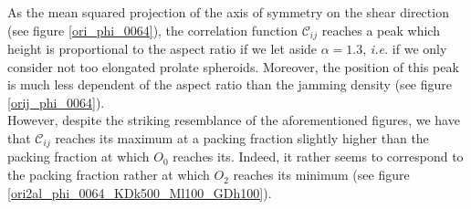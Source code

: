 \documentclass[class=report, float=false, crop=false]{standalone}
\begin{document}
As the mean squared projection of the axis of symmetry on the shear direction (see figure \ref{ori_phi_0064}), the correlation function $\mathcal{C}_{ij}$ reaches a peak which height is proportional to the aspect ratio if we let aside $\alpha=1.3$, \textit{i.e.} if we only consider not too elongated prolate spheroids. Moreover, the position of this peak is much less dependent of the aspect ratio than the jamming density (see figure \ref{orij_phi_0064}).\\

However, despite the striking resemblance of the aforementioned figures, we have that $\mathcal{C}_{ij}$ reaches its maximum at a packing fraction slightly higher than the packing fraction at which $O_0$ reaches its. Indeed, it rather seems to correspond to the packing fraction rather at which $O_2$ reaches its minimum (see figure \ref{ori2al_phi_0064_KDk500_Ml100_GDh100}).

\end{document}
